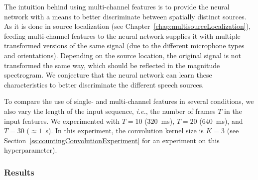 The intuition behind using multi-channel features is to provide the neural network with a means to better discriminate between spatially distinct sources. As it is done in source localization (see Chapter~\ref{chap:multisourceLocalization}), feeding multi-channel features to the neural network supplies it with multiple transformed versions of the same signal (due to the different microphone types and orientations). Depending on the source location, the original signal is not transformed the same way, which should be reflected in the magnitude spectrogram. We conjecture that the neural network can learn these characteristics to better discriminate the different speech sources.

To compare the use of single- and multi-channel features in several conditions, we also vary the length of the input sequence, \emph{i.e.}, the number of frames $T$ in the input features. We experimented with $T=10$ ($320$~ms), $T=20$ ($640$~ms), and $T=30$ ($\approx 1$~s). In this experiment, the convolution kernel size is $K=3$ (see Section~\ref{ss:countingConvolutionExperiment} for an experiment on this hyperparameter).

\subsubsection{Results}

